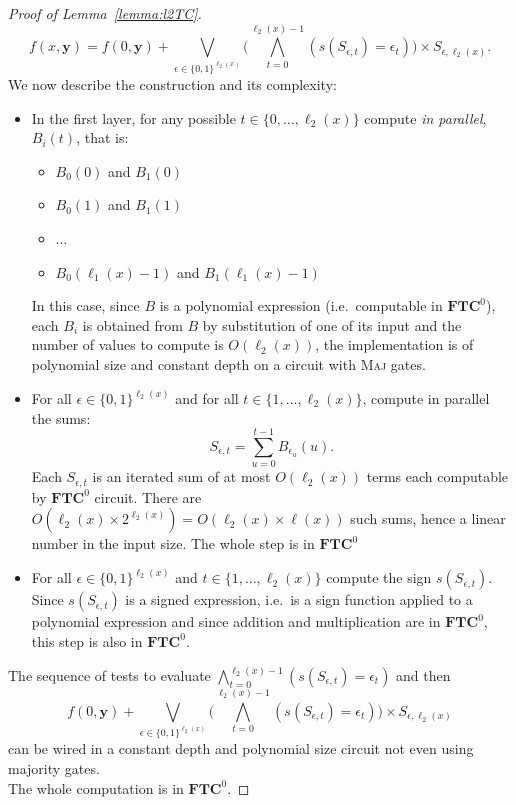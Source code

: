 \documentclass[11pt, oneside]{article}
\newcommand{\TC}{\mathbf{FTC}}
\newcommand{\tu}[1]{\mathbf{#1}}
\theoremstyle{definition}
\begin{document}
\begin{toappendix}
\begin{proof}[Proof of Lemma~\ref{lemma:l2TC}]
        $$
            f(x, \tu y) = f(0, \tu y) + \bigvee_{\epsilon \in \{0,1\}^{\ell_2(x)}}\bigg(\bigwedge^{\ell_2(x)-1}_{t=0} (s(S_{\epsilon,t})=\epsilon_t)\bigg) \times S_{\epsilon, \ell_2(x)}.
        $$
        We now describe the construction and its complexity:
        \begin{itemize}
            \itemsep0em
            \item In the first layer, for any possible $t\in \{0, \dots, \ell_2(x)\}$ compute \emph{in parallel}, $B_i(t)$, that is:
            \begin{itemize}
                \itemsep0em
                \item $B_0(0)$ and $B_1(0)$
                \item $B_0(1)$ and $B_1(1)$
                \item $\dots$
                \item $B_0(\ell_1(x)-1)$ and $B_1(\ell_1(x)-1)$
            \end{itemize}
            In this case, since $B$ is a polynomial expression (i.e.~computable in $\TC^0$), each $B_i$ is obtained from $B$ by substitution of one of its input and the number of values to compute is $O(\ell_2(x))$, the implementation is of polynomial size and constant depth on a  circuit with \textsc{Maj} gates.
            \item For all $\epsilon \in \{0,1\}^{\ell_2(x)}$ and for all $t\in \{1,\dots, \ell_2(x)\}$, compute in parallel the sums:
            $$
                S_{\epsilon, t} = \sum^{t-1}_{u=0} B_{\epsilon_u}(u).
            $$
            Each $S_{\epsilon,t}$ is an iterated sum of at most $O(\ell_2(x))$ terms each computable by $\TC^0$ circuit.
            There are $O(\ell_2(x) \times 2^{\ell_2(x)})=O(\ell_2(x)\times \ell(x))$ such sums, hence a linear number in the input size.
            The whole step is in $\TC^0$
            \item For all $\epsilon \in \{0,1\}^{\ell_2(x)}$ and $t\in \{1,\dots, \ell_2(x)\}$ compute the sign $s(S_{\epsilon, t})$. 
            Since $s(S_{\epsilon,t})$ is a signed expression, i.e.~is a sign function applied to a polynomial expression and since addition and multiplication are in $\TC^0$, this step is also in $\TC^0$. 
        \end{itemize}
        The sequence of tests to evaluate $\bigwedge^{\ell_2(x)-1}_{t=0} (s(S_{\epsilon, t})=\epsilon_t)$ and then
        $$
            f(0, \tu y) + \bigvee_{\epsilon \in \{0,1\}^{\ell_2(x)}} \bigg(\bigwedge^{\ell_2(x)-1}_{t=0} (s(S_{\epsilon, t})=\epsilon_t)\bigg) \times S_{\epsilon, \ell_2(x)}
        $$
        can be wired in a constant depth and polynomial size circuit not even using majority gates.
        \\
        The whole computation is in $\TC^0$.
    \end{proof}
\end{toappendix}
\end{document}
